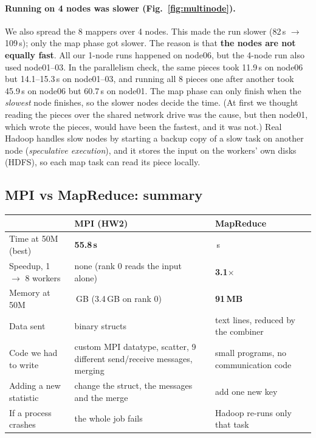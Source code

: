 \documentclass[10pt,a4paper]{article}
\begin{document}
\paragraph{Running on 4 nodes was slower (Fig.~\ref{fig:multinode}).}
We also spread the 8 mappers over 4 nodes. This made the run slower (82\,s $\to$ 109\,s); only the map phase got slower. The
reason is that \textbf{the nodes are not equally fast}. All our 1-node runs happened on node06, but the 4-node run also used
node01--03. In the parallelism check, the same pieces took 11.9\,s on node06 but 14.1--15.3\,s on node01--03, and running all 8
pieces one after another took 45.9\,s on node06 but 60.7\,s on node01. The map phase can only finish when the \emph{slowest} node
finishes, so the slower nodes decide the time. (At first we thought reading the pieces over the shared network drive was the
cause, but then node01, which wrote the pieces, would have been the fastest, and it was not.) Real Hadoop handles slow nodes
by starting a backup copy of a slow task on another node (\emph{speculative execution}), and it stores the input on the
workers' own disks (HDFS), so each map task can read its piece locally.

\subsection{MPI vs MapReduce: summary}
\begin{center}\small
\begin{tabularx}{\textwidth}{>{\raggedright\arraybackslash}p{3cm}>{\raggedright\arraybackslash}X>{\raggedright\arraybackslash}X}
\toprule
 & MPI (HW2) & MapReduce \\
\midrule
Time at 50M (best) & \textbf{55.8\,s} & 81.5\,s \\
Speedup, 1 $\to$ 8 workers & none (rank 0 reads the input alone) & \textbf{3.1$\times$} \\
Memory at 50M & 7.6\,GB (3.4\,GB on rank 0) & \textbf{91\,MB} \\
Data sent & binary structs & text lines, reduced by the combiner \\
Code we had to write & custom MPI datatype, scatter, 9 different send/receive messages, merging & 3 small programs, no communication code \\
Adding a new statistic & change the struct, the messages and the merge & add one new key \\
If a process crashes & the whole job fails & Hadoop re-runs only that task \\
\bottomrule
\end{tabularx}
\end{center}
\end{document}
